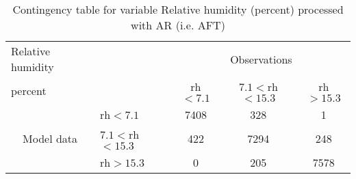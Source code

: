 
\begin{table}[]
\begin{center}
\begin{tabular}{llccc}
\hline
{Relative humidity}                                       &                                                    & \multicolumn{3}{c}{Observations}                 \\
{percent}                                       &                             & rh$<7.1$   & $7.1<$rh$<15.3$ & rh$>15.3$ \\
\hline
\multicolumn{1}{c}{\multirow{3}{*}{Model data}}  & rh$<7.1$          & 7408                & 328                       & 1              \\
                                                 & $7.1<$rh$<15.3$ & 422                & 7294                       & 248              \\
                                                 & rh$>15.3$          & 0                & 205                       & 7578              \\
\hline
\end{tabular}
\end{center}
\caption{Contingency table for variable Relative humidity (percent) processed with AR (i.e. AFT)}
\label{tab:contingency}
\end{table}

